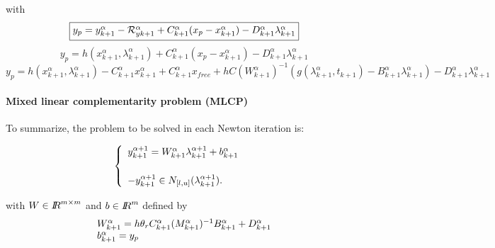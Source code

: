 with 
\begin{equation}
\fbox{$y_p = y^{\alpha}_{k+1} -\mathcal R^{\alpha}_{yk+1} + C^{\alpha}_{k+1}(x_p -x^{\alpha}_{k+1}) -
D^{\alpha}_{k+1} \lambda^{\alpha}_{k+1} $}
\end{equation}
\begin{equation}
y_p = h(x^{\alpha}_{k+1},\lambda^{\alpha}_{k+1}) + C^{\alpha}_{k+1}(x_p -x^{\alpha}_{k+1}) -
D^{\alpha}_{k+1} \lambda^{\alpha}_{k+1} 
\end{equation}
\begin{equation}
y_p = h(x^{\alpha}_{k+1},\lambda^{\alpha}_{k+1}) - C^{\alpha}_{k+1}x^{\alpha}_{k+1}
+C^{\alpha}_{k+1} x_{free} +hC(W^{\alpha}_{k+1})^{-1}(g(\lambda
^{\alpha}_{k+1},t_{k+1})-B^{\alpha}_{k+1} \lambda^{\alpha}_{k+1}) -
D^{\alpha}_{k+1} \lambda^{\alpha}_{k+1} 
\end{equation}

\paragraph{Mixed linear complementarity problem (MLCP)}To summarize, the problem to be solved in each Newton iteration is:\\{
  \begin{minipage}[l]{1.0\linewidth}
    \begin{equation}
      \begin{cases}
      \begin{array}[l]{l}
        y^{\alpha+1}_{k+1} =   W^{\alpha}_{k+1}  \lambda^{\alpha+1}_{k+1} + b^{\alpha}_{k+1}
        \\ \\
        -y^{\alpha+1}_{k+1} \in N_{[l,u]}(\lambda^{\alpha+1}_{k+1} ). 
      \end{array}
      \label{eq:NL14}
      \end{cases}
    \end{equation}
  \end{minipage}
}
with $W\in \mbox{\rm $I\!\!R$}^{m\times m}$ and $b\in\mbox{\rm $I\!\!R$}^{m}$ defined by
\begin{equation}
  \label{eq:NL15}
 \begin{array}[l]{l}
   W^{\alpha}_{k+1} = h \theta _r C^{\alpha}_{k+1} (M^{\alpha}_{k+1})^{-1}  B^{\alpha}_{k+1} + D^{\alpha}_{k+1} \\
   b^{\alpha}_{k+1} = y_p
\end{array}
\end{equation}


